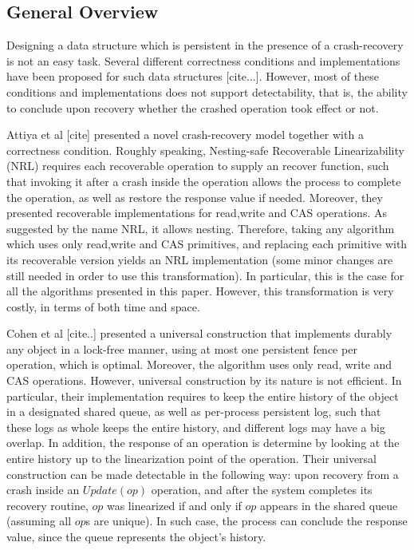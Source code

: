 \subsection{General Overview}
Designing a data structure which is persistent in the presence of a crash-recovery is not an easy task. Several different correctness conditions and implementations have been proposed for such data structures [cite...]. However, most of these conditions and implementations does not support detectability, that is, the ability to conclude upon recovery whether the crashed operation took effect or not.

Attiya et al [cite] presented a novel crash-recovery model together with a correctness condition. Roughly speaking, Nesting-safe Recoverable Linearizability (NRL) requires each recoverable operation to supply an recover function, such that invoking it after a crash inside the operation allows the process to complete the operation, as well as restore the response value if needed. Moreover, they presented recoverable implementations for read,write and CAS operations. As suggested by the name NRL, it allows nesting. Therefore, taking any algorithm which uses only read,write and CAS primitives, and replacing each primitive with its recoverable version yields an NRL implementation (some minor changes are still needed in order to use this transformation). In particular, this is the case for all the algorithms presented in this paper. However, this transformation is very costly, in terms of both time and space.

Cohen et al [cite..] presented a universal construction that implements durably any object in a lock-free manner, using at most one persistent fence per operation, which is optimal. Moreover, the algorithm uses only read, write and CAS operations. However, universal construction by its nature is not efficient. In particular, their implementation requires to keep the entire history of the object in a designated shared queue, as well as per-process persistent log, such that these logs as whole keeps the entire history, and different logs may have a big overlap. In addition, the response of an operation is determine by looking at the entire history up to the linearization point of the operation. Their universal construction can be made detectable in the following way: upon recovery from a crash inside an $Update(op)$ operation, and after the system completes its recovery routine, $op$ was linearized if and only if $op$ appears in the shared queue (assuming all $op$s are unique). In such case, the process can conclude the response value, since the queue represents the object's history.

